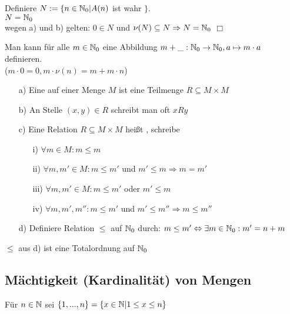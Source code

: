 \begin{bew}
	Definiere $N:=\{n\in\mathbb{N}_{0}|A(n)$ ist wahr $\}$. \\
	\zz $N=\mathbb{N}_{0}$\\
	wegen a) und b) gelten: $0\in N$ und $\nu(N)\subseteq N\Rightarrow N=\mathbb{N}_{0}$ \hfill $\Box$\
\end{bew}

\begin{bem}
	Man kann  für alle $m\in\mathbb{N}_{0}$ eine Abbildung $m+\_ :\mathbb{N}_{0}\rightarrow\mathbb{N}_{0}, a\mapsto m\cdot a$ definieren.\\%
	($m\cdot 0=0, m\cdot\nu(n)=m+m\cdot n$)
\end{bem}

\begin{defi}
	\begin{itemize}
		\item[]
		\item[a)] Eine  auf einer Menge $M$ ist eine Teilmenge $R\subseteq M\times M$
		\item[b)] An Stelle $(x,y)\in R$ schreibt man oft $xRy$
		\item[c)] Eine Relation $R\subseteq M\times M$ heißt , schreibe \anf{$\leq$}
		\begin{itemize}
			\item[i)] $\forall m\in M:m\leq m$
			\item[ii)] $\forall m,m'\in M:m\leq m'$ und $m'\leq m\Rightarrow m=m'$
			\item[iii)] $\forall m,m'\in M:m\leq m'$ oder $m'\leq m$
			\item[iv)] $\forall m,m',m'':m\leq m'$ und $m'\leq m''\Rightarrow m\leq m''$
		\end{itemize}
		\item[d)] Definiere Relation $\leq$ auf $\mathbb{N}_{0}$ durch: $m\leq m'\Leftrightarrow\exists m\in\mathbb{N}_{0}:m'=n+m$
	\end{itemize}
\end{defi}

\begin{prop}
	$\leq$ aus d) ist eine Totalordnung auf $\mathbb{N}_{0}$
\end{prop}

\subsection{Mächtigkeit (Kardinalität) von Mengen}

Für $n\in\mathbb{N}$ sei $\{1,...,n\}=\{x\in\mathbb{N}|1\leq x\leq n\}$\\

